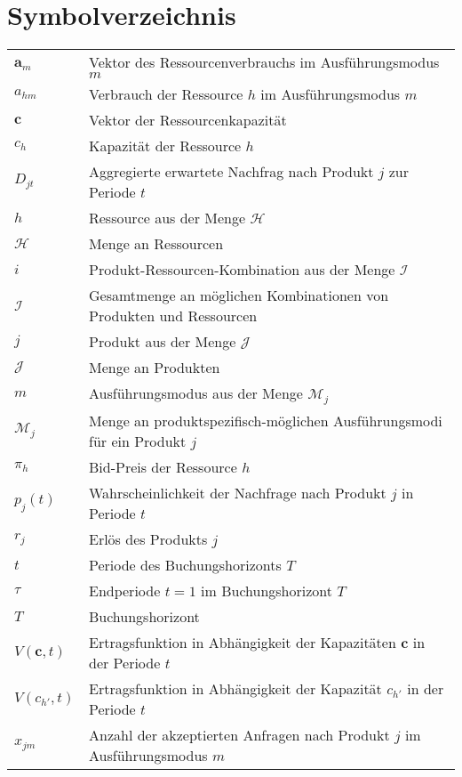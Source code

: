 \documentclass[a4paper,12pt,normalheadings,footexclude,headinclude,liststotoc,nochapterprefix,onecolumn,oneside,parskip,pointlessnumbers]{scrreprt}
\begin{document}
\chapter*{Symbolverzeichnis}
\begin{table}[h!]
    \vspace*{-3mm}
    \hspace*{2mm}
  \renewcommand{\arraystretch}{1,5}
  \begin{flushleft}
    \begin{tabular}{lp{11.5cm}}  %
    $\textbf{a}_{m}$ & Vektor des Ressourcenverbrauchs im Ausführungsmodus $m$\\
    $a_{hm}$ &	Verbrauch der Ressource $h$ im Ausführungsmodus $m$\\
   $\textbf{c}$ & Vektor der Ressourcenkapazität\\
   $c_{h}$ & Kapazität der Ressource $h$\\
    $D_{jt}$ & Aggregierte erwartete Nachfrag nach Produkt $j$ zur Periode $t$\\
    $h$	& Ressource aus der Menge $\mathcal{H}$\\
    $\mathcal{H}$ & Menge an Ressourcen\\
    $i$ & Produkt-Ressourcen-Kombination aus der Menge $\mathcal{I}$\\
    $\mathcal{I}$ & Gesamtmenge an möglichen Kombinationen von Produkten und Ressourcen\\
    $j$ & Produkt aus der Menge $\mathcal{J}$\\
$\mathcal{J}$ & Menge an Produkten \\   
$m$ & Ausführungsmodus aus der Menge $\mathcal{M}_{j}$\\
    $\mathcal{M}_{j}$ & Menge an produktspezifisch-möglichen Ausführungsmodi für ein Produkt $j$\\
 $\pi_{h}$ & Bid-Preis der Ressource $h$\\
   $p_{j}(t)$ & Wahrscheinlichkeit der Nachfrage nach Produkt $j$ in Periode $t$\\
    $r_{j}$ & Erlös des Produkts $j$\\
    $t$ & Periode des Buchungshorizonts $T$\\
        $\tau$ & Endperiode $t=1$ im Buchungshorizont $T$\\ 
        $T$ & Buchungshorizont\\
   $V(\textbf{c},t)$ & Ertragsfunktion in Abhängigkeit der Kapazitäten $\textbf{c}$ in der Periode $t$\\
      $V(c_{h'},t)$ & Ertragsfunktion in Abhängigkeit der Kapazität $c_{h'}$ in der Periode $t$\\
    $x_{jm}$ & Anzahl der akzeptierten Anfragen nach Produkt $j$ im Ausführungsmodus $m$\\
	\end{tabular}
	\end{flushleft}
\end{table}
\end{document}
